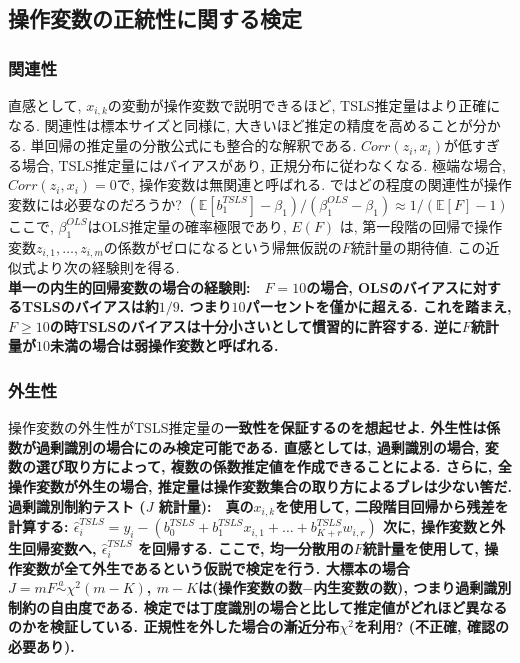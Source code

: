 \documentclass[paper=a4paper,fontsize=10pt]{jlreq}
\begin{document}
\subsection{操作変数の正統性に関する検定}
\subsubsection{関連性}
直感として, $x_{i,k}$の変動が操作変数で説明できるほど, TSLS推定量はより正確になる. 関連性は標本サイズと同様に, 大きいほど推定の精度を高めることが分かる. 単回帰の推定量の分散公式にも整合的な解釈である. $Corr(z_i , x_i)$が低すぎる場合, TSLS推定量にはバイアスがあり, 正規分布に従わなくなる. 極端な場合, $Corr(z_i , x_i) = 0$で, 操作変数は無関連と呼ばれる. ではどの程度の関連性が操作変数には必要なのだろうか? $(\mathbb{E}[b_1^{TSLS}] - \beta_1)/(\beta_1^{OLS} - \beta_1) \approx 1/(\mathbb{E}[F] - 1)$ ここで, $\beta_1^{OLS}$はOLS推定量の確率極限であり, $E(F)$ は, 第一段階の回帰で操作変数$z_{i,1}, \dots, z_{i,m}$の係数がゼロになるという帰無仮説の$F$統計量の期待値. この近似式より次の経験則を得る.\\

\rmfamily\mcfamily\bfseries{単一の内生的回帰変数の場合の経験則}\mdseries :　$F = 10$の場合, OLSのバイアスに対するTSLSのバイアスは約$1/9$. つまり$10$パーセントを僅かに超える. これを踏まえ, $F \geq 10$の時TSLSのバイアスは十分小さいとして慣習的に許容する. 逆に$F$統計量が$10$未満の場合は\rmfamily\mcfamily\bfseries{弱操作変数}\mdseries と呼ばれる.\\

\subsubsection{外生性}
操作変数の外生性がTSLS推定量の\rmfamily\mcfamily\bfseries{一致性}\mdseries を保証するのを想起せよ. 外生性は係数が過剰識別の場合にのみ検定可能である. 直感としては, 過剰識別の場合, 変数の選び取り方によって, 複数の係数推定値を作成できることによる. さらに, 全操作変数が外生の場合, 推定量は操作変数集合の取り方によるブレは少ない筈だ.\\

\rmfamily\mcfamily\bfseries{過剰識別制約テスト ($J$ 統計量)}\mdseries :　真の$x_{i,k}$を使用して, 二段階目回帰から残差を計算する: $\hat{\epsilon}_i^{TSLS} = y_i - (b_0^{TSLS} + b_1^{TSLS} x_{i,1} + \dots + b_{K+r}^{TSLS} w_{i,r})$
次に, 操作変数と外生回帰変数へ, $\hat{\epsilon}_i^{TSLS}$ を回帰する. ここで, \rmfamily\mcfamily\bfseries{均一分散用の}\mdseries $F$統計量を使用して, 操作変数が全て外生であるという仮説で検定を行う. 大標本の場合 $J = mF \overset{a}{\sim} \chi^2(m - K)$, $m - K$は(操作変数の数$-$内生変数の数), つまり過剰識別制約の自由度である. 検定では丁度識別の場合と比して推定値がどれほど異なるのかを検証している. 正規性を外した場合の漸近分布$\chi^2$を利用? (不正確, 確認の必要あり).\\
\end{document}
